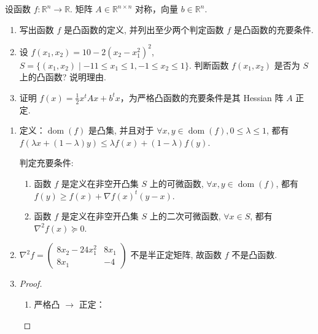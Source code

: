 

\newcommand\Title{最优化习题}

\newcommand\subject{\operatorname{s.t.}}
\newcommand\dom{\operatorname{dom}} %

\renewcommand{\labelenumi}{(\arabic*)}


\begin{Problem}
    设函数 $f:\mathbb{R}^n\to \mathbb{R}$. 矩阵 $A \in \mathbb{R}^{n\times n}$ 对称，向量 $b \in \mathbb{R}^n$.
    \begin{enumerate}
        \item 写出函数 $f$ 是凸函数的定义, 并列出至少两个判定函数 $f$ 是凸函数的充要条件.
        \item 设 $f(x_1, x_2) = 10 - 2(x_2 - x_1^2)^2$, $S = \{(x_1, x_2) \mid -11 \le x_1 \le 1, -1 \le x_2 \le 1\}$. 判断函数 $f(x_1, x_2)$ 是否为 $S$ 上的凸函数? 说明理由.
        \item 证明 $f(x) = \frac{1}{2}x^tAx + b^tx$，为严格凸函数的充要条件是其 Hessian 阵 $A$ 正定.
    \end{enumerate}

    \Answer \text{} \begin{enumerate}
        \item 定义：$\dom(f)$ 是凸集, 并且对于 $\forall x, y \in \dom(f), 0 \le \lambda \le 1$, 都有 $f(\lambda x + (1 - \lambda)y) \le \lambda f(x) + (1 - \lambda)f(y)$.
        
        判定充要条件: 
        \begin{enumerate}
            \item 函数 $f$ 是定义在非空开凸集 $S$ 上的可微函数, $\forall x, y \in \dom(f)$, 都有 $f(y) \ge f(x) + \nabla f(x)^t(y - x)$.
            \item 函数 $f$ 是定义在非空开凸集 $S$ 上的二次可微函数, $\forall x \in S$, 都有 $\nabla^2f(x) \succeq 0$.
        \end{enumerate}
        \item $\nabla^2f = \begin{pmatrix}
            8x_2 - 24x_1^2 & 8x_1 \\
            8x_1 & -4
        \end{pmatrix}$ 不是半正定矩阵, 故函数 $f$ 不是凸函数.
        \item \begin{proof}\text{}
            \begin{enumerate}
                \item 严格凸 $\to$ 正定：
                

\end{enumerate}
\end{proof}
\end{enumerate}
\end{Problem}
